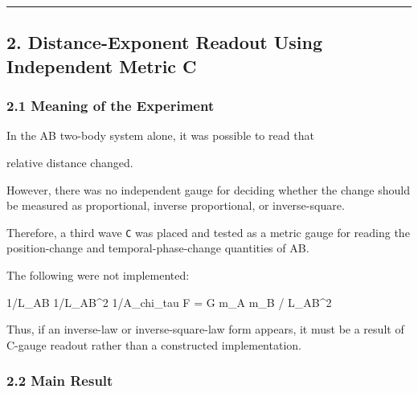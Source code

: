 \documentclass[
]{article}
\newenvironment{Shaded}{}{}
\newcommand{\NormalTok}[1]{#1}
\begin{document}
\begin{center}\rule{0.5\linewidth}{0.5pt}\end{center}

\subsection{2. Distance-Exponent Readout Using Independent Metric
C}\label{distance-exponent-readout-using-independent-metric-c}

\subsubsection{2.1 Meaning of the
Experiment}\label{meaning-of-the-experiment}

In the AB two-body system alone, it was possible to read that

\begin{Shaded}
\begin{Highlighting}[]
\NormalTok{relative distance changed.}
\end{Highlighting}
\end{Shaded}

However, there was no independent gauge for deciding whether the change
should be measured as proportional, inverse proportional, or
inverse-square.

Therefore, a third wave \texttt{C} was placed and tested as a metric
gauge for reading the position-change and temporal-phase-change
quantities of AB.

The following were not implemented:

\begin{Shaded}
\begin{Highlighting}[]
\NormalTok{1/L\_AB}
\NormalTok{1/L\_AB\^{}2}
\NormalTok{1/A\_chi\_tau}
\NormalTok{F = G m\_A m\_B / L\_AB\^{}2}
\end{Highlighting}
\end{Shaded}

Thus, if an inverse-law or inverse-square-law form appears, it must be a
result of C-gauge readout rather than a constructed implementation.

\subsubsection{2.2 Main Result}\label{main-result}
\end{document}
